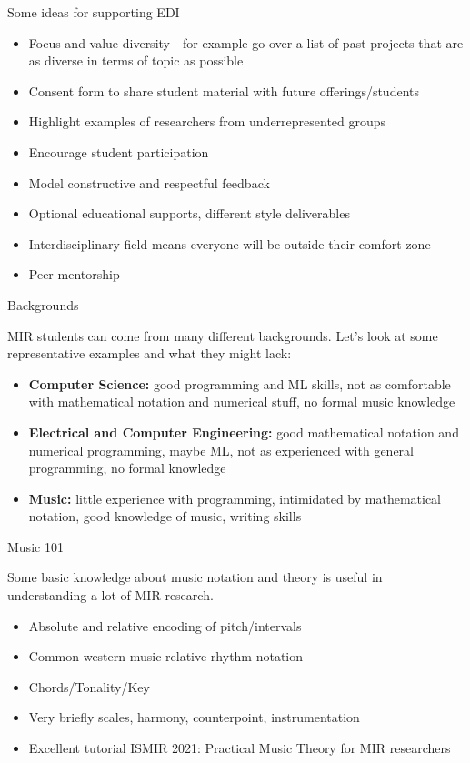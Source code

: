 \documentclass[12pt]{beamer}
\begin{document}
\begin{frame}{Some ideas for supporting EDI}
  \begin{itemize}
\item{Focus and value diversity - for example go over a list of past projects that are as diverse in terms of topic as possible }
\item{Consent form to share student material with future offerings/students}
\item{Highlight examples of researchers from underrepresented groups}
\item{Encourage student participation}
\item{Model constructive and respectful feedback}
\item{Optional educational supports, different style deliverables}
\item{Interdisciplinary field means everyone will be outside their comfort zone}
\item{Peer mentorship}
\end{itemize} 
\end{frame} 


\begin{frame}{Backgrounds}

  MIR students can come from many different backgrounds. Let's look
  at some representative examples and what they might lack:

  \begin{itemize}
  \item{{\bf Computer Science:} good programming and ML skills, not as comfortable with mathematical notation and numerical stuff, no formal music knowledge}
  \item{{\bf Electrical and Computer Engineering:} good mathematical notation
    and numerical programming, maybe ML, not as experienced with general programming, no formal knowledge}
    \item{{\bf Music:} little experience with programming, intimidated by mathematical notation, good knowledge of music, writing skills}
    \end{itemize} 

\end{frame}

\begin{frame}{Music 101}

  Some basic knowledge about music notation and theory is useful in
  understanding a lot of MIR research.

  \begin{itemize}
  \item{Absolute and relative encoding of pitch/intervals}
  \item{Common western music relative rhythm notation}
  \item{Chords/Tonality/Key}
  \item{Very briefly scales, harmony, counterpoint, instrumentation}
   \item{Excellent tutorial ISMIR 2021: Practical Music Theory for MIR researchers}
  \end{itemize}
  \end{frame} 
\end{document}
